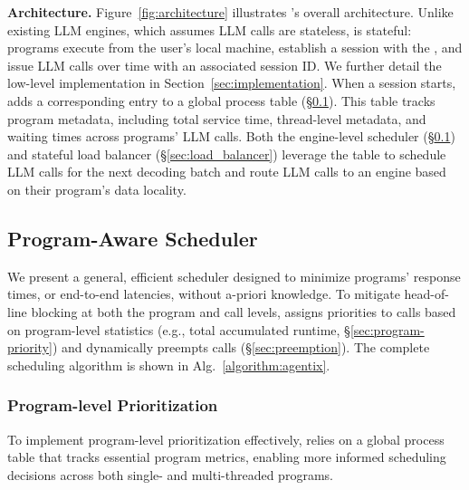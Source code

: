 \vspace{1.5mm} 
\noindent \textbf{Architecture.} Figure~\ref{fig:architecture} illustrates \text{\name}'s overall architecture. Unlike existing LLM engines, which assumes LLM calls are stateless, \text{\name} is stateful: programs execute from the user's local machine, establish a session with the \text{\name}, and issue LLM calls over time with an associated session ID. We further detail the low-level implementation in Section~\ref{sec:implementation}. When a session starts, \text{\name} adds a corresponding entry to a global process table (\S\ref{sec:agentix_policy}). This table tracks program metadata, including total service time, thread-level metadata, and waiting times across programs' LLM calls. Both the engine-level scheduler (\S\ref{sec:agentix_policy}) and stateful load balancer (\S\ref{sec:load_balancer}) leverage the table to schedule LLM calls for the next decoding batch and route LLM calls to an engine based on their program's data locality. %


\subsection{Program-Aware Scheduler}
\label{sec:agentix_policy}


We present a general, efficient scheduler designed to minimize programs' response times, or end-to-end latencies, without a-priori knowledge. To mitigate head-of-line blocking at both the program and call levels, \text{\name} assigns priorities to calls based on program-level statistics (e.g., total accumulated runtime, \S\ref{sec:program-priority}) and dynamically preempts calls (\S\ref{sec:preemption}). The complete scheduling algorithm is shown in Alg.~\ref{algorithm:agentix}.

\subsubsection{Program-level Prioritization}
To implement program-level prioritization effectively, \text{\name} relies on a global process table that tracks essential program metrics, enabling more informed scheduling decisions across both single- and multi-threaded programs.
\label{sec:program-priority}

